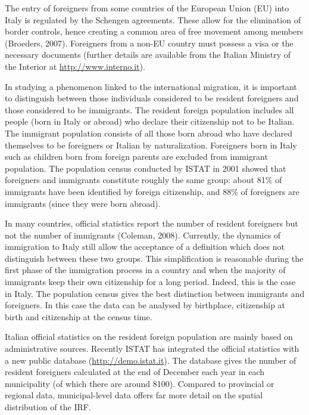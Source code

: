 The entry of foreigners from some countries of the European Union (EU) into Italy is regulated by the Schengen agreements. These allow for the elimination of border controls, hence creating a common area of free movement among members (Broeders, 2007). Foreigners from a non-EU country must possess a visa or the necessary documents (further details are available from the Italian Ministry of the Interior at \url{http://www.interno.it}). 
 
In studying a phenomenon linked to the international migration, it is important to distinguish between those individuals considered to be resident foreigners and those considered to be immigrants. The resident foreign population includes all people (born in Italy or abroad) who declare their citizenship not to be Italian. The immigrant population consists of all those born abroad who have declared themselves to be foreigners or Italian by naturalization. Foreigners born in Italy such as children born from foreign parents are excluded from immigrant population. The population census conducted by ISTAT in 2001 showed that foreigners and immigrants constitute roughly the same group: about 81\% of immigrants have been identified by foreign citizenship, and 88\% of foreigners are immigrants (since they were born abroad).

In many countries, official statistics report the number of resident foreigners but not the number of immigrants (Coleman, 2008). Currently, the dynamics of immigration to Italy still allow the acceptance of a definition which does not distinguish between these two groups. This simplification is reasonable during the first phase of the immigration process in a country and when the majority of immigrants keep their own citizenship for a long period. Indeed, this is the case in Italy. The population census gives the best distinction between immigrants and foreigners. In this case the data can be analysed by birthplace, citizenship at birth and citizenship at the census time. 
 
Italian official statistics on the resident foreign population are mainly based on administrative sources. Recently ISTAT has integrated the official statistics with a new public database (\url{http://demo.istat.it}). The database gives the number of resident foreigners calculated at the end of December each year in each municipality (of which there are around 8100). Compared to provincial or regional data, municipal-level data offers far more detail on the spatial distribution of the IRF.
 
